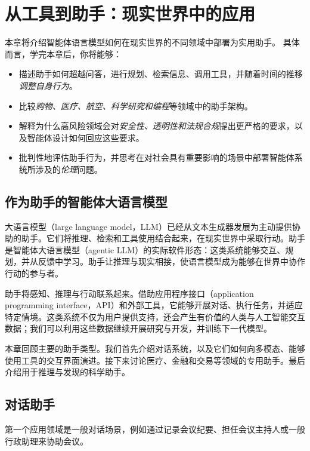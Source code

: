\chapter[从工具到助手]{从工具到助手：现实世界中的应用}
\label{sec:assist}

\begin{learningbox}
本章将介绍智能体语言模型如何在现实世界的不同领域中部署为实用助手。
具体而言，学完本章后，你将能够：
\begin{itemize}[leftmargin=*, nosep]
    \item 描述助手如何超越问答，进行规划、检索信息、调用工具，并随着时间的推移{\em 调整自身行为}。
    \item 比较{\em 购物、医疗、航空、科学研究和编程}等领域中的助手架构。
    \item 解释为什么高风险领域会对{\em 安全性、透明性和法规合规}提出更严格的要求，以及智能体设计如何回应这些要求。
    \item 批判性地评估助手行为，并思考在对社会具有重要影响的场景中部署智能体系统所涉及的{\em 伦理}问题。
\end{itemize}
\end{learningbox}

\section{作为助手的智能体大语言模型}
大语言模型（large language model，LLM）已经从文本生成器发展为主动提供协助的助手。它们将推理、检索和工具使用结合起来，在现实世界中采取行动。助手是智能体大语言模型（agentic LLM）的实际软件形态：这类系统能够交互、规划，并从反馈中学习。助手让推理与现实相接，使语言模型成为能够在世界中协作行动的参与者。

助手将感知、推理与行动联系起来。借助应用程序接口（application programming interface，API）和外部工具，它能够开展对话、执行任务，并适应特定情境。这类系统不仅为用户提供支持，还会产生有价值的人类与人工智能交互数据；我们可以利用这些数据继续开展研究与开发，并训练下一代模型。

本章回顾主要的助手类型。我们首先介绍对话系统，以及它们如何向多模态、能够使用工具的交互界面演进。接下来讨论医疗、金融和交易等领域的专用助手。最后介绍用于推理与发现的科学助手。

\section{对话助手}

第一个应用领域是一般对话场景，例如通过记录会议纪要、担任会议主持人或一般行政助理来协助会议。

